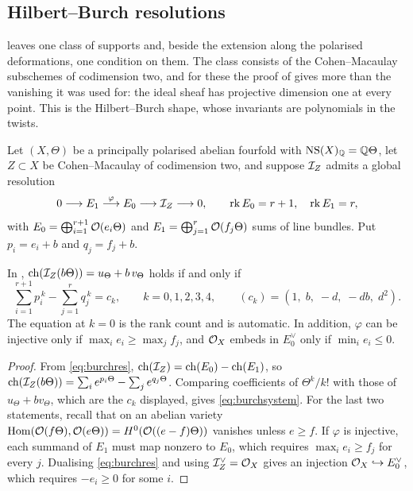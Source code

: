 \subsection{Hilbert--Burch resolutions}
\label{ssec:hilbertburch}

 leaves one class of supports and, beside the
extension along the polarised deformations, one condition on them.
The class consists of the Cohen--Macaulay subschemes of codimension two, and
for these the proof of  gives more than the vanishing
it was used for: the ideal sheaf has projective dimension one at every point.
This is the Hilbert--Burch shape, whose invariants are polynomials in the twists.

\begin{setupenv}\label{setup:burch}
Let $(X,\Theta)$ be a principally polarised abelian fourfold with
$\mathrm{NS}(X)_{\mathbb{Q}}=\mathbb{Q}\Theta$, let $Z\subset X$ be Cohen--Macaulay of codimension
two, and suppose $\mathcal{I}_{Z}$ admits a global resolution
\begin{equation}\label{eq:burchres}
  0\longrightarrow E_{1}\stackrel{\varphi}{\longrightarrow}E_{0}
  \longrightarrow\mathcal{I}_{Z}\longrightarrow0,
  \qquad \operatorname{rk} E_{0}=r+1,\quad\operatorname{rk} E_{1}=r,
\end{equation}
with $E_{0}=\bigoplus_{i=1}^{r+1}\mathcal{O}(e_{i}\Theta)$ and
$E_{1}=\bigoplus_{j=1}^{r}\mathcal{O}(f_{j}\Theta)$ sums of line bundles. Put
$p_{i}=e_{i}+b$ and $q_{j}=f_{j}+b$.
\end{setupenv}

\begin{lemma}\label{lem:burchmoments}
In , $\operatorname{ch}(\mathcal{I}_{Z}(b\Theta))=u_{\Theta}+b\,v_{\Theta}$ holds
if and only if
\begin{equation}\label{eq:burchsystem}
  \sum_{i=1}^{r+1}p_{i}^{\,k}-\sum_{j=1}^{r}q_{j}^{\,k}=c_{k},
  \qquad k=0,1,2,3,4,
  \qquad (c_{k})=(1,\;b,\;-d,\;-db,\;d^{2}).
\end{equation}
The equation at $k=0$ is the rank count and is automatic. In addition,
$\varphi$ can be injective only if $\max_{i}e_{i}\ge\max_{j}f_{j}$, and
$\mathcal{O}_{X}$ embeds in $E_{0}^{\vee}$ only if $\min_{i}e_{i}\le0$.
\end{lemma}

\begin{proof}
From \eqref{eq:burchres}, $\operatorname{ch}(\mathcal{I}_{Z})=\operatorname{ch}(E_{0})-\operatorname{ch}(E_{1})$, so
$\operatorname{ch}(\mathcal{I}_{Z}(b\Theta))=\sum_{i}e^{p_{i}\Theta}-\sum_{j}e^{q_{j}\Theta}$.
Comparing coefficients of $\Theta^{k}/k!$ with those of
$u_{\Theta}+bv_{\Theta}$, which are the $c_{k}$ displayed, gives
\eqref{eq:burchsystem}. For the last two statements, recall that on an
abelian variety $\operatorname{Hom}(\mathcal{O}(f\Theta),\mathcal{O}(e\Theta))=H^{0}(\mathcal{O}((e-f)\Theta))$
vanishes unless $e\ge f$. If $\varphi$ is injective, each summand of $E_{1}$
must map nonzero to $E_{0}$, which requires $\max_{i}e_{i}\ge f_{j}$ for
every $j$. Dualising \eqref{eq:burchres} and using $\mathcal{I}_{Z}^{\vee}=\mathcal{O}_{X}$
gives an injection $\mathcal{O}_{X}\hookrightarrow E_{0}^{\vee}$, which requires
$-e_{i}\ge0$ for some $i$.
\end{proof}

